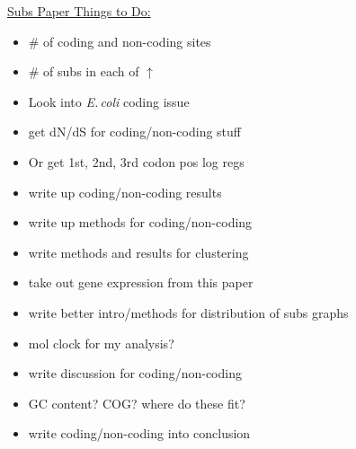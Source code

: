 \documentclass[12pt]{article}
\newcommand{\ecol}{\textit{E.\,coli}\xspace}
\begin{document}
\underline{Subs Paper Things to Do:}
\begin{itemize}
	\item \# of coding and non-coding sites
	
	\item \# of subs in each of $\uparrow$
	
	\item Look into \ecol coding issue
	
	\item get dN/dS for coding/non-coding stuff
	 
	\item Or get 1st, 2nd, 3rd codon pos log regs
	
	\item write up coding/non-coding results
	
	\item write up methods for coding/non-coding
	
	\item write methods and results for clustering
	
	\item take out gene expression from this paper
	
	\item write better intro/methods for distribution of subs graphs
	
	\item mol clock for my analysis?
	
	\item write discussion for coding/non-coding
	
	\item GC content? COG? where do these fit?
	
	\item write coding/non-coding into conclusion
	
\end{itemize}
\end{document}
